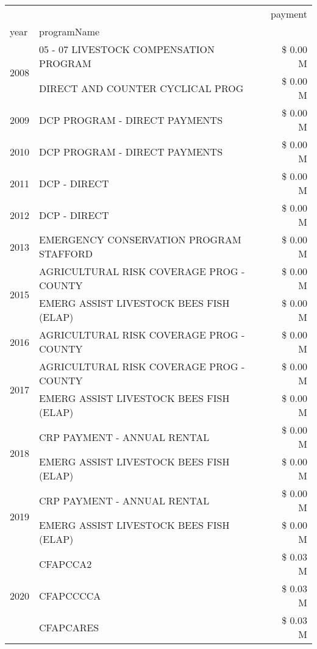 \begin{tabular}{llr}
\toprule
 &  & payment \\
year & programName &  \\
\midrule
\multirow[t]{2}{*}{2008} & 05 - 07 LIVESTOCK COMPENSATION PROGRAM & \$ 0.00 M \\
 & DIRECT AND COUNTER CYCLICAL PROG & \$ 0.00 M \\
\cline{1-3}
2009 & DCP PROGRAM - DIRECT PAYMENTS & \$ 0.00 M \\
\cline{1-3}
2010 & DCP PROGRAM - DIRECT PAYMENTS & \$ 0.00 M \\
\cline{1-3}
2011 & DCP - DIRECT & \$ 0.00 M \\
\cline{1-3}
2012 & DCP - DIRECT & \$ 0.00 M \\
\cline{1-3}
2013 & EMERGENCY CONSERVATION PROGRAM STAFFORD & \$ 0.00 M \\
\cline{1-3}
\multirow[t]{2}{*}{2015} & AGRICULTURAL RISK COVERAGE PROG - COUNTY & \$ 0.00 M \\
 & EMERG ASSIST LIVESTOCK BEES FISH (ELAP) & \$ 0.00 M \\
\cline{1-3}
2016 & AGRICULTURAL RISK COVERAGE PROG - COUNTY & \$ 0.00 M \\
\cline{1-3}
\multirow[t]{2}{*}{2017} & AGRICULTURAL RISK COVERAGE PROG - COUNTY & \$ 0.00 M \\
 & EMERG ASSIST LIVESTOCK BEES FISH (ELAP) & \$ 0.00 M \\
\cline{1-3}
\multirow[t]{2}{*}{2018} & CRP PAYMENT - ANNUAL RENTAL & \$ 0.00 M \\
 & EMERG ASSIST LIVESTOCK BEES FISH (ELAP) & \$ 0.00 M \\
\cline{1-3}
\multirow[t]{2}{*}{2019} & CRP PAYMENT - ANNUAL RENTAL & \$ 0.00 M \\
 & EMERG ASSIST LIVESTOCK BEES FISH (ELAP) & \$ 0.00 M \\
\cline{1-3}
\multirow[t]{3}{*}{2020} & CFAPCCA2 & \$ 0.03 M \\
 & CFAPCCCCA & \$ 0.03 M \\
 & CFAPCARES & \$ 0.03 M \\
\cline{1-3}
\bottomrule
\end{tabular}
